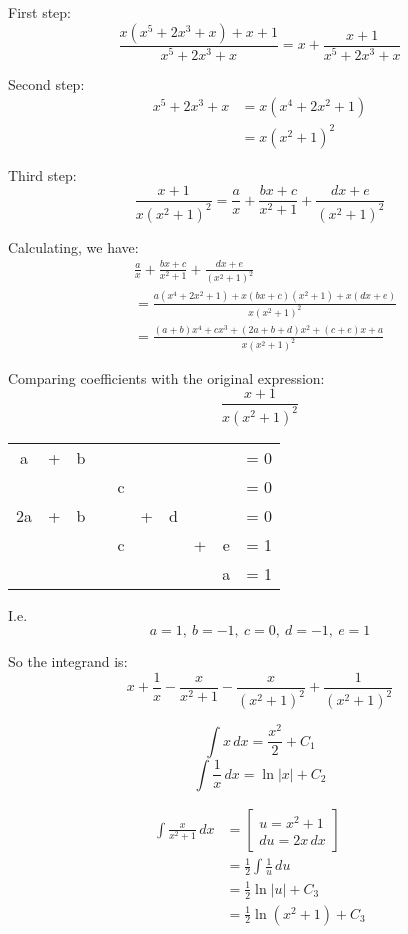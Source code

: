 \documentclass[11pt]{article}
\begin{document}
First step:
\[\frac{x(x^5 + 2x^3 + x) + x + 1}{x^5 + 2x^3 + x} = x + \frac{x + 1}{x^5 + 2x^3 + x}\]

Second step:
\begin{align*}
x^5 + 2x^3 + x &= x(x^4 + 2x^2 + 1) \\
&= x(x^2 + 1)^2
\end{align*}

Third step:
\[\frac{x + 1}{x(x^2 + 1)^2} = \frac{a}{x} + \frac{bx + c}{x^2 + 1} + \frac{dx + e}{(x^2 + 1)^2}\]

Calculating, we have:
\begin{align*}
&\frac{a}{x} + \frac{bx + c}{x^2 + 1} + \frac{dx + e}{(x^2 + 1)^2} \\
&= \frac{a(x^4 + 2x^2 + 1) + x(bx + c)(x^2 + 1) + x(dx + e)}{x(x^2 + 1)^2} \\
&= \frac{(a + b)x^4 + cx^3 + (2a + b + d)x^2 + (c + e)x + a}{x(x^2 + 1)^2}
\end{align*}

Comparing coefficients with the original expression:
\[\frac{x + 1}{x(x^2 + 1)^2}\]

\begin{center}
\begin{tabular}{c c c c c c c c c c}
a  & + & b &   &   &   &   &   &   &= 0 \\
   &   &   &   & c &   &   &   &   &= 0 \\
2a & + & b &   &   & + & d &   &   &= 0 \\
   &   &   &   & c &   &   & + & e &= 1 \\
   &   &   &   &   &   &   &   & a &= 1
\end{tabular}
\end{center}

I.e.
\[a = 1, \ b = -1, \ c = 0, \ d = -1, \ e = 1\]

So the integrand is:
\[x + \frac{1}{x} - \frac{x}{x^2 + 1} - \frac{x}{(x^2 + 1)^2} + \frac{1}{(x^2 + 1)^2}\]

\[\int x \, dx = \frac{x^2}{2} + C_1\]
\[\int \frac{1}{x} \, dx = \ln |x| + C_2\]

\begin{align*}
\int \frac{x}{x^2 + 1} \, dx &= \left[ \begin{gathered} u = x^2 + 1 \\ du = 2x \, dx \end{gathered} \right] \\
&= \frac{1}{2} \int \frac{1}{u} \, du \\
&= \frac{1}{2} \ln |u| + C_3 \\
&= \frac{1}{2} \ln (x^2 + 1) + C_3
\end{align*}
\end{document}
